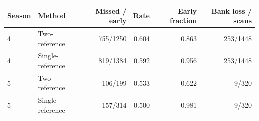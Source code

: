 \begin{tabular}{llrrrr}
\toprule
Season & Method & Missed / early & Rate & Early fraction & Bank loss / scans \\
\midrule
4 & Two-reference & 755/1250 & 0.604 & 0.863 & 253/1448 \\
4 & Single-reference & 819/1384 & 0.592 & 0.956 & 253/1448 \\
5 & Two-reference & 106/199 & 0.533 & 0.622 & 9/320 \\
5 & Single-reference & 157/314 & 0.500 & 0.981 & 9/320 \\
\bottomrule
\end{tabular}